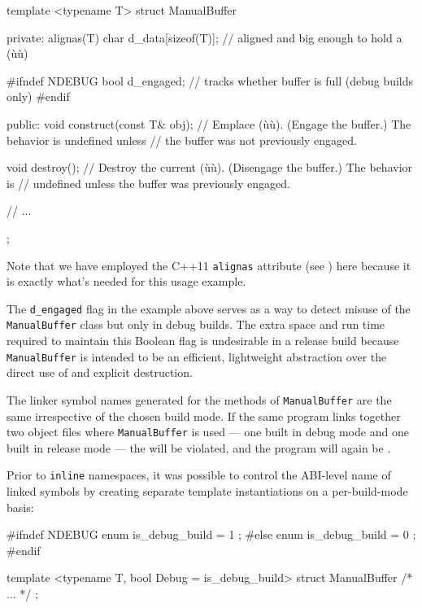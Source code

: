 \begin{emcppslisting}
template <typename T>
struct ManualBuffer
{
private:
    alignas(T) char d_data[sizeof(T)];  // aligned and big enough to hold a (ù{}ù)

#ifndef NDEBUG
    bool d_engaged;  // tracks whether buffer is full (debug builds only)
#endif

public:
    void construct(const T& obj);
        // Emplace (ù{}ù). (Engage the buffer.) The behavior is undefined unless
        // the buffer was not previously engaged.

    void destroy();
        // Destroy the current (ù{}ù). (Disengage the buffer.) The behavior is
        // undefined unless the buffer was previously engaged.

    // ...
};
\end{emcppslisting}

\noindent Note that we have
  employed the C++11 \lstinline!alignas! attribute (see )
  here
  because it is exactly what's needed for this usage example.

The \lstinline!d_engaged! flag in the example above serves as a way to detect misuse of
the \mbox{\lstinline!ManualBuffer!} class but only in debug builds. The extra
space and run time required to maintain this Boolean flag is undesirable
in a release build because \mbox{\lstinline!ManualBuffer!} is intended to be an
efficient, lightweight abstraction over the direct use of
 and explicit destruction.

The linker symbol names generated for the methods of
\lstinline!ManualBuffer! are the same irrespective of the chosen build
mode. If the same program links together two object files where
\lstinline!ManualBuffer! is used --- one built in debug mode and one built
in release mode --- the  will be violated,
and the program will again be .

Prior
to \lstinline!inline! namespaces, it was possible to control the
ABI-level name of linked symbols by creating separate template
instantiations on a per-build-mode basis:

\begin{emcppslisting}[]
#ifndef NDEBUG
enum { is_debug_build = 1 };
#else
enum { is_debug_build = 0 };
#endif

template <typename T, bool Debug = is_debug_build>
struct ManualBuffer { /* ... */ };
\end{emcppslisting}

